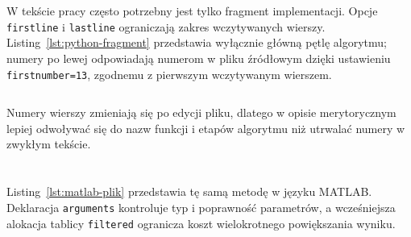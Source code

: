 \section{}

W tekście pracy często potrzebny jest tylko fragment implementacji. Opcje
\texttt{firstline} i \texttt{lastline} ograniczają zakres wczytywanych wierszy.
Listing~\ref{lst:python-fragment} przedstawia wyłącznie główną pętlę algorytmu;
numery po lewej odpowiadają numerom w pliku źródłowym dzięki ustawieniu
\texttt{firstnumber=13}, zgodnemu z pierwszym wczytywanym wierszem.



\begin{lstlisting}[style=thesis,caption={Wybór zakresu wierszy z pliku źródłowego},label={lst:inputlisting-zakres}]

\end{lstlisting}

Numery wierszy zmieniają się po edycji pliku, dlatego w opisie merytorycznym lepiej
odwoływać się do nazw funkcji i etapów algorytmu niż utrwalać numery w zwykłym tekście.

\section{}

Listing~\ref{lst:matlab-plik} przedstawia tę samą metodę w języku MATLAB. Deklaracja
\texttt{arguments} kontroluje typ i poprawność parametrów, a wcześniejsza alokacja
tablicy \texttt{filtered} ogranicza koszt wielokrotnego powiększania wyniku.



\section{}

